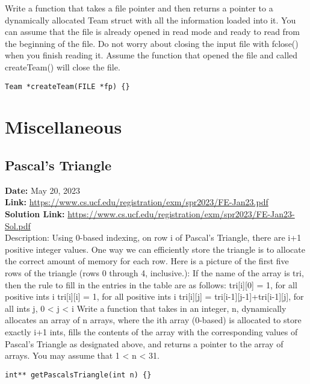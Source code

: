 \documentclass{article}
\begin{document}
Write a function that takes a file pointer and then returns a pointer to a dynamically allocated Team struct with all the information loaded into it. You can assume that the file is already opened in read mode and ready to read from the beginning of the file. Do not worry about closing the input file with fclose() when you finish reading it. Assume the function that opened the file and called createTeam() will close the file.

\begin{verbatim}
Team *createTeam(FILE *fp) {}
\end{verbatim}






\newpage

\section{Miscellaneous}
\subsection{Pascal's Triangle}

\textbf{Date:} May 20, 2023 \\

\textbf{Link:} \url{https://www.cs.ucf.edu/registration/exm/spr2023/FE-Jan23.pdf} \\

\textbf{Solution Link:} \url{https://www.cs.ucf.edu/registration/exm/spr2023/FE-Jan23-Sol.pdf} \\

Description: Using 0-based indexing, on row i of Pascal’s Triangle, there are i+1 positive integer values. One way we can efficiently store the triangle is to allocate the correct amount of memory for each row. Here is a picture of the first five rows of the triangle (rows 0 through 4, inclusive.):
If the name of the array is tri, then the rule to fill in the entries in the table are as follows:
tri[i][0] = 1, for all positive ints i
tri[i][i] = 1, for all positive ints i
tri[i][j] = tri[i-1][j-1]+tri[i-1][j], for all ints j, 0 < j < i
Write a function that takes in an integer, n, dynamically allocates an array of n arrays, where the ith array (0-based) is allocated to store exactly i+1 ints, fills the contents of the array with the corresponding values of Pascal’s Triangle as designated above, and returns a pointer to the array of arrays. You may assume that 1 < n < 31.

\begin{verbatim}
int** getPascalsTriangle(int n) {}
\end{verbatim}
\end{document}
